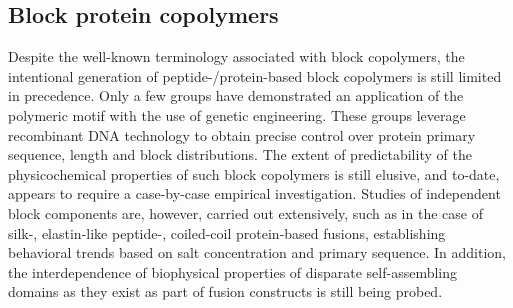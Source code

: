 \begin{refsection}
\subsection{Block protein copolymers}

Despite the well-known terminology associated with block
copolymers,\cite{Hamley2004} the intentional generation of
peptide-/protein-based block copolymers is still limited in precedence. Only a
few groups have demonstrated an application of the polymeric motif with the
use of genetic
engineering.\cite{Higashiya2007,Lim2008a,Chen2008a,Xu2005,Osborne2008} These
groups leverage recombinant DNA technology to obtain precise control over
protein primary sequence, length and block distributions.  The extent of
predictability of the physicochemical properties of such block copolymers is
still elusive, and to-date, appears to require a case-by-case empirical
investigation. Studies of independent block components are, however, carried out
extensively, such as in the case of silk-, elastin-like peptide-, coiled-coil
protein-based fusions, establishing behavioral trends based on salt
concentration and primary sequence.\cite{Nuhn2008,Reiersen1998,Cho2008} In
addition, the interdependence of biophysical properties of disparate
self-assembling domains as they exist as part of fusion constructs is still
being probed. 


\end{refsection}
